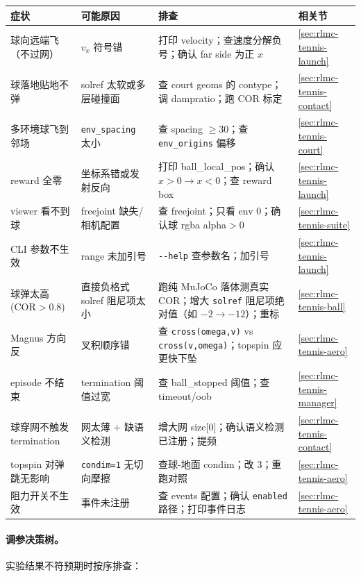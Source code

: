 \begin{center}
\small
\begin{tabular}{@{}p{3.4cm}p{3.2cm}p{4.4cm}l@{}}
\toprule
症状 & 可能原因 & 排查 & 相关节 \\
\midrule
球向远端飞（不过网） & $v_x$ 符号错 & 打印 velocity；查速度分解负号；确认 far side 为正 $x$ & \cref{sec:rlmc-tennis-launch} \\
球落地贴地不弹 & solref 太软或多层碰撞面 & 查 court geoms 的 contype；调 dampratio；跑 COR 标定 & \cref{sec:rlmc-tennis-contact} \\
多环境球飞到邻场 & \verb|env_spacing| 太小 & 查 spacing $\ge30$；查 \verb|env_origins| 偏移 & \cref{sec:rlmc-tennis-court} \\
reward 全零 & 坐标系错或发射反向 & 打印 ball\_local\_pos；确认 $x>0\to x<0$；查 reward box & \cref{sec:rlmc-tennis-launch} \\
viewer 看不到球 & freejoint 缺失/相机配置 & 查 freejoint；只看 env 0；确认球 rgba alpha$>0$ & \cref{sec:rlmc-tennis-suite} \\
CLI 参数不生效 & range 未加引号 & \verb|--help| 查参数名；加引号 & \cref{sec:rlmc-tennis-launch} \\
球弹太高(COR$>0.8$) & 直接负格式 solref 阻尼项太小 & 跑纯 MuJoCo 落体测真实 COR；增大 \verb|solref| 阻尼项绝对值（如 $-2\to-12$）；重标 & \cref{sec:rlmc-tennis-ball} \\
Magnus 方向反 & 叉积顺序错 & 查 \verb|cross(omega,v)| vs \verb|cross(v,omega)|；topspin 应更快下坠 & \cref{sec:rlmc-tennis-aero} \\
episode 不结束 & termination 阈值过宽 & 查 ball\_stopped 阈值；查 timeout/oob & \cref{sec:rlmc-tennis-manager} \\
球穿网不触发 termination & 网太薄 $+$ 缺语义检测 & 增大网 size[0]；确认语义检测已注册；提频 & \cref{sec:rlmc-tennis-contact} \\
topspin 对弹跳无影响 & \verb|condim=1| 无切向摩擦 & 查球-地面 condim；改 $3$；重跑对照 & \cref{sec:rlmc-tennis-aero} \\
阻力开关不生效 & 事件未注册 & 查 events 配置；确认 \verb|enabled| 路径；打印事件日志 & \cref{sec:rlmc-tennis-aero} \\
\bottomrule
\end{tabular}
\end{center}

\paragraph{调参决策树。}实验结果不符预期时按序排查：


